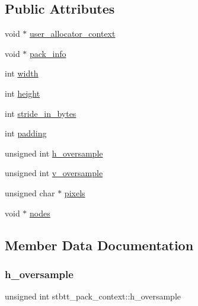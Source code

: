 \subsection*{Public Attributes}
\begin{DoxyCompactItemize}
\item 
void $\ast$ \mbox{\hyperlink{structstbtt__pack__context_a45fddc4d4adfcef58aa08ad2874cedc0}{user\+\_\+allocator\+\_\+context}}
\item 
void $\ast$ \mbox{\hyperlink{structstbtt__pack__context_a303a72f0a39479b439fa531925be7031}{pack\+\_\+info}}
\item 
int \mbox{\hyperlink{structstbtt__pack__context_a5da0b7b5d3b82d5fc75ea1c8945183fa}{width}}
\item 
int \mbox{\hyperlink{structstbtt__pack__context_a817ec010d7f09ba9776517c5a87f13a7}{height}}
\item 
int \mbox{\hyperlink{structstbtt__pack__context_abbe9a25aae0e26b81a5f7339fac23801}{stride\+\_\+in\+\_\+bytes}}
\item 
int \mbox{\hyperlink{structstbtt__pack__context_a1191f34fa995910044191584f0d7a803}{padding}}
\item 
unsigned int \mbox{\hyperlink{structstbtt__pack__context_aee1019f9634cad49fa07e8e1f897d6b7}{h\+\_\+oversample}}
\item 
unsigned int \mbox{\hyperlink{structstbtt__pack__context_a4b55efa27ef36e7f258afe92921784c0}{v\+\_\+oversample}}
\item 
unsigned char $\ast$ \mbox{\hyperlink{structstbtt__pack__context_a6549105fd1922df983fbe036b9db4a1a}{pixels}}
\item 
void $\ast$ \mbox{\hyperlink{structstbtt__pack__context_a11a73fa6860e6be1ac039fcca9db2c7c}{nodes}}
\end{DoxyCompactItemize}


\subsection{Member Data Documentation}
\mbox{\label{structstbtt__pack__context_aee1019f9634cad49fa07e8e1f897d6b7}} 
\subsubsection{\texorpdfstring{h\+\_\+oversample}{h\_oversample}}
{\footnotesize\ttfamily unsigned int stbtt\+\_\+pack\+\_\+context\+::h\+\_\+oversample}

